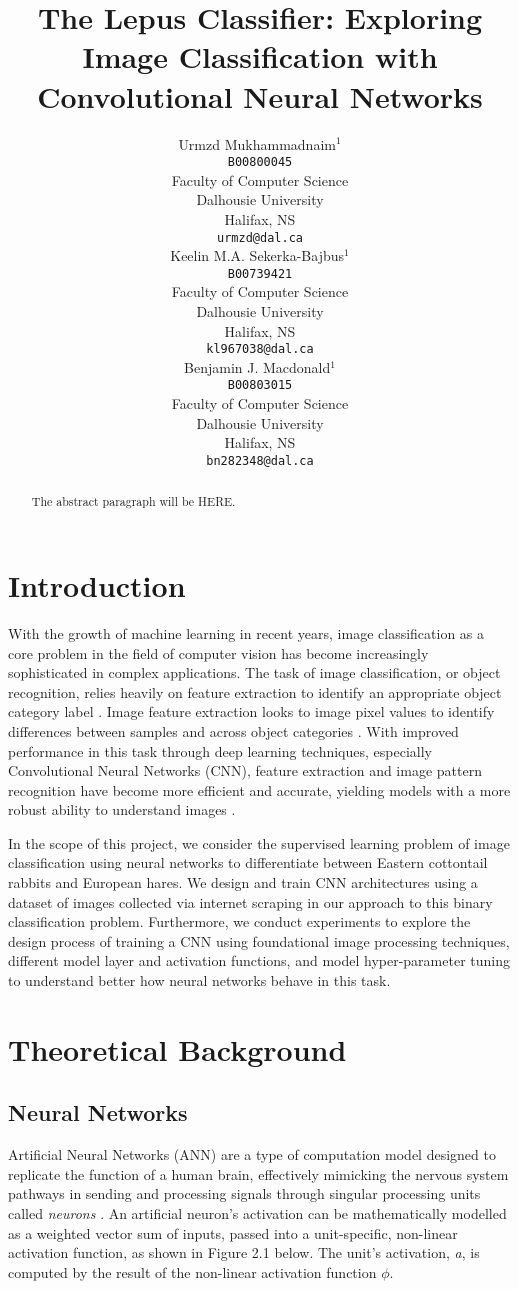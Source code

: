 \documentclass{article}
\title{The Lepus Classifier: Exploring Image Classification with Convolutional Neural Networks}
\author{%
  Urmzd
  Mukhammadnaim$^1$\\
  \texttt{B00800045}\\
  Faculty of Computer Science\\
  Dalhousie University\\
  Halifax, NS  \\
  \texttt{urmzd@dal.ca} \\
  \And
  Keelin M.A.
  Sekerka-Bajbus$^1$\\
  \texttt{B00739421}\\
  Faculty of Computer Science\\
  Dalhousie University\\
  Halifax, NS  \\
  \texttt{kl967038@dal.ca} \\
  \AND
  Benjamin J. Macdonald$^1$ \\
  \texttt{B00803015}\\
  Faculty of Computer Science\\
  Dalhousie University\\
  Halifax, NS  \\
  \texttt{bn282348@dal.ca} \\
}
\begin{document}
\maketitle
\begin{abstract}
  The abstract paragraph will be HERE.
\end{abstract}

\section{Introduction}

With the growth of machine learning in recent years, image classification as a core problem in the field of computer vision has become increasingly sophisticated in complex applications. The task of image classification, or object recognition, relies heavily on feature extraction to identify an appropriate object category label \cite{SHARMA2018377,8078730}. Image feature extraction looks to image pixel values to identify differences between samples and across object categories \cite{SHARMA2018377}. With improved performance in this task through deep learning techniques, especially Convolutional Neural Networks (CNN), feature extraction and image pattern recognition have become more efficient and accurate, yielding models with a more robust ability to understand images \cite{SHARMA2018377,8078730}.

In the scope of this project, we consider the supervised learning problem of image classification using neural networks to differentiate between Eastern cottontail rabbits and European hares. We design and train CNN architectures using a dataset of images collected via internet scraping in our approach to this binary classification problem. Furthermore, we conduct experiments to explore the design process of training a CNN using foundational image processing techniques, different model layer and activation functions, and model hyper-parameter tuning to understand better how neural networks behave in this task.

\section{Theoretical Background}
\subsection{Neural Networks}
Artificial Neural Networks (ANN) are a type of computation model designed to replicate the function of a human brain, effectively mimicking the nervous system pathways in sending and processing signals through singular processing units called \emph{neurons} \cite{gurney1997introduction}. An artificial neuron’s activation can be mathematically modelled as a weighted vector sum of inputs, passed into a unit-specific, non-linear activation function, as shown in Figure 2.1 below. The unit’s activation, \emph{a}, is computed by the result of the non-linear activation function $\phi$.
\end{document}
